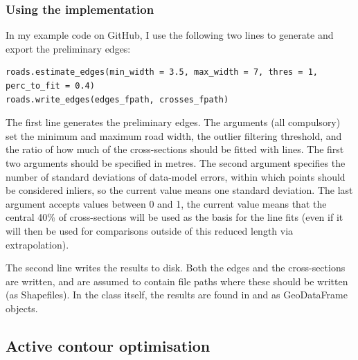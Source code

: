 \subsubsection{Using the implementation}

In my example code on GitHub, I use the following two lines to generate and export the preliminary edges:

\begin{lstlisting}
roads.estimate_edges(min_width = 3.5, max_width = 7, thres = 1, perc_to_fit = 0.4)
roads.write_edges(edges_fpath, crosses_fpath)
\end{lstlisting}

The first line generates the preliminary edges. The arguments (all compulsory) set the minimum and maximum road width, the outlier filtering threshold, and the ratio of how much of the cross-sections should be fitted with lines. The first two arguments should be specified in metres. The second argument specifies the number of standard deviations of data-model errors, within which points should be considered inliers, so the current value means one standard deviation. The last argument accepts values between 0 and 1, the current value means that the central 40\% of cross-sections will be used as the basis for the line fits (even if it will then be used for comparisons outside of this reduced length via extrapolation).

The second line writes the results to disk. Both the edges and the cross-sections are written,  and  are assumed to contain file paths where these should be written (as Shapefiles). In the class itself, the results are found in  and  as GeoDataFrame objects.

\subsection{Active contour optimisation}
\label{sub:r_activecontours}

